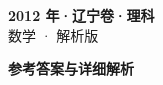 \documentclass[zihao=-4, a4paper]{ctexart}
\begin{document}
\begin{center}
  {\Large\bfseries 2012 年·辽宁卷·理科}\\[4pt]
  {\large 数学 · 解析版}
\end{center}
\medskip
{}

\clearpage
{}
\begin{center}{\Large\bfseries 参考答案与详细解析}\end{center}
\medskip

\end{document}

